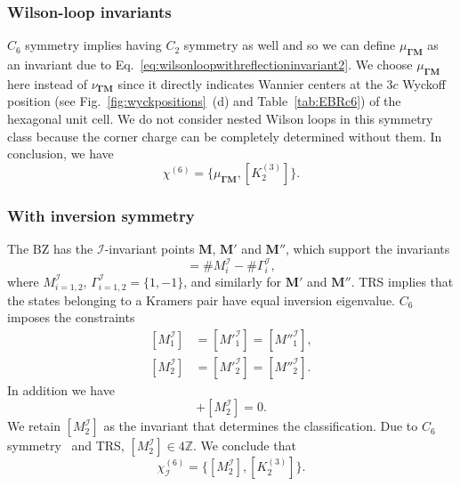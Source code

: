 \subsubsection*{Wilson-loop invariants} 
$C_6$ symmetry implies having $C_2$ symmetry as well and so we can define $\mu_{\mathbf{\Gamma M}}$ as an invariant due to Eq.~\eqref{eq:wilsonloopwithreflectioninvariant2}. We choose $\mu_{\mathbf{\Gamma M}}$ here instead of $\nu_{\mathbf{\Gamma M}}$ since it directly indicates Wannier centers at the $3c$ Wyckoff position (see Fig.~\ref{fig:wyckpositions}~(d) and Table~\ref{tab:EBRc6}) of the hexagonal unit cell. We do not consider nested Wilson loops in this symmetry class because the corner charge can be completely determined without them.
In conclusion, we have
\begin{equation} 
\chi^{(6)}=\{\mu_{\mathbf{\Gamma M}},[K^{(3)}_2]\}.
\end{equation}

\subsubsection*{With inversion symmetry}
The BZ has the $\mathcal{I}$-invariant points $\mathbf{M}$, $\mathbf{M'}$ and $\mathbf{M''}$, which support the invariants
\begin{equation} 
[M^\mathcal{I}_i]= \#M^\mathcal{I}_i - \#\Gamma^{\mathcal{I}}_i,
\end{equation}
where $M^\mathcal{I}_{i=1,2}$, $\Gamma^{\mathcal{I}}_{i=1,2}=\{1,-1\}$, and similarly for $\mathbf{M'}$ and $\mathbf{M''}$. TRS implies that the states belonging to a Kramers pair have equal inversion eigenvalue. $C_6$ imposes the constraints
\begin{equation} 
\begin{aligned}
[M^\mathcal{I}_1] &= [M'^{\mathcal{I}}_1] = [M''^{\mathcal{I}}_1], \\
[M^\mathcal{I}_2] &= [M'^{\mathcal{I}}_2] = [M''^{\mathcal{I}}_2].
\end{aligned} 
\label{eq:C6_constraintsForInversion}
\end{equation}
In addition we have
\begin{equation}
[M^\mathcal{I}_1]+[M^\mathcal{I}_2]=0.
\end{equation}
We retain $[M^\mathcal{I}_2]$ as the invariant that determines the classification. Due to $C_6$ symmetry~\cite{benalcazar2018quantization} and TRS, $[M^\mathcal{I}_2] \in 4 \mathbb{Z}$. We conclude that
\begin{equation} 
\chi^{(6)}_\mathcal{I}=\{[M^\mathcal{I}_2],[K^{(3)}_2]\}.
\end{equation}

